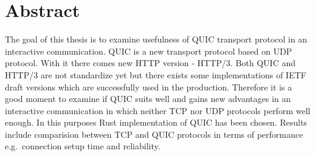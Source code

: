 
\section{Abstract}
\label{sec:abstract}

The goal of this thesis is to examine usefulness of QUIC transport protocol
in an interactive communication.
QUIC is a new transport protocol based on UDP protocol.
With it there comes new HTTP version - HTTP/3.
Both QUIC and HTTP/3 are not standardize yet but there exists some implementations
of IETF draft versions which are successfully used in the production.
Therefore it is a good moment to examine if QUIC suits well
and gains new advantages in an interactive communication
in which neither TCP nor UDP protocols perform well enough.
In this purposes Rust implementation of QUIC has been chosen.
Results include comparision between TCP and QUIC protocols in terms
of performance e.g.~connection setup time and reliability.
